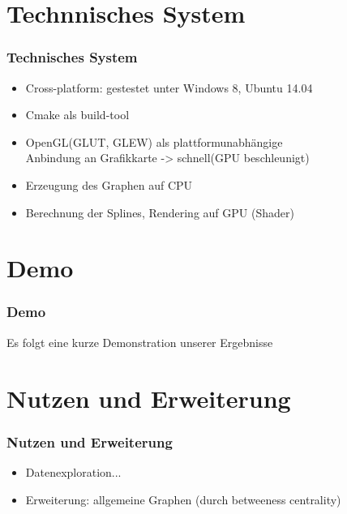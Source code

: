 \documentclass[11pt]{beamer}
\begin{document}
\section{Technnisches System}
\begin{frame}
\frametitle{Technisches System}

\begin{itemize}
\item Cross-platform: gestestet unter Windows 8, Ubuntu 14.04
\item Cmake als build-tool
\item OpenGL(GLUT, GLEW) als plattformunabhängige  
\\ Anbindung an Grafikkarte -> schnell(GPU beschleunigt) 
\item Erzeugung des Graphen auf CPU
\item Berechnung der Splines, Rendering auf GPU (Shader)
\end{itemize}

\end{frame}



\section{Demo}
\begin{frame}
\frametitle{Demo}

Es folgt eine kurze Demonstration unserer Ergebnisse

\end{frame}


\section{Nutzen und Erweiterung}
\begin{frame}
\frametitle{Nutzen und Erweiterung}

\begin{itemize}
\item Datenexploration...
\item Erweiterung: allgemeine Graphen (durch betweeness centrality)
\end{itemize}

\end{frame}
\end{document}
